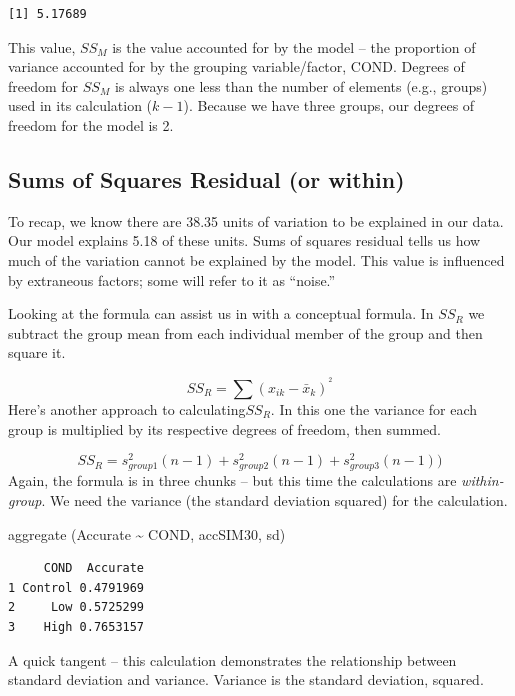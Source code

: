 \documentclass[
  english,
]{book}
\newenvironment{Shaded}{\begin{snugshade}}{\end{snugshade}}
\newcommand{\FunctionTok}[1]{\textcolor[rgb]{0.00,0.00,0.00}{#1}}
\newcommand{\NormalTok}[1]{#1}
\newcommand{\SpecialCharTok}[1]{\textcolor[rgb]{0.00,0.00,0.00}{#1}}
\begin{document}
\begin{verbatim}
[1] 5.17689
\end{verbatim}

This value, \(SS_M\) is the value accounted for by the model -- the proportion of variance accounted for by the grouping variable/factor, COND. Degrees of freedom for \(SS_M\) is always one less than the number of elements (e.g., groups) used in its calculation (\(k-1\)). Because we have three groups, our degrees of freedom for the model is 2.

\hypertarget{sums-of-squares-residual-or-within}{%
\subsection{Sums of Squares Residual (or within)}\label{sums-of-squares-residual-or-within}}

To recap, we know there are 38.35 units of variation to be explained in our data. Our model explains 5.18 of these units. Sums of squares residual tells us how much of the variation cannot be explained by the model. This value is influenced by extraneous factors; some will refer to it as ``noise.''

Looking at the formula can assist us in with a conceptual formula. In \(SS_R\) we subtract the group mean from each individual member of the group and then square it.

\[SS_{R}= \sum(x_{ik}-\bar{x}_{k})^{^{2}}\]
Here's another approach to calculating\(SS_R\). In this one the variance for each group is multiplied by its respective degrees of freedom, then summed.

\[SS_{R}= s_{group1}^{2}(n-1) + s_{group2}^{2}(n-1) + s_{group3}^{2}(n-1))\]
Again, the formula is in three chunks -- but this time the calculations are \emph{within-group}. We need the variance (the standard deviation squared) for the calculation.

\begin{Shaded}
\begin{Highlighting}[]
\FunctionTok{aggregate}\NormalTok{ (Accurate }\SpecialCharTok{\textasciitilde{}}\NormalTok{ COND, accSIM30, sd)}
\end{Highlighting}
\end{Shaded}

\begin{verbatim}
     COND  Accurate
1 Control 0.4791969
2     Low 0.5725299
3    High 0.7653157
\end{verbatim}

A quick tangent -- this calculation demonstrates the relationship between standard deviation and variance. Variance is the standard deviation, squared.
\end{document}
